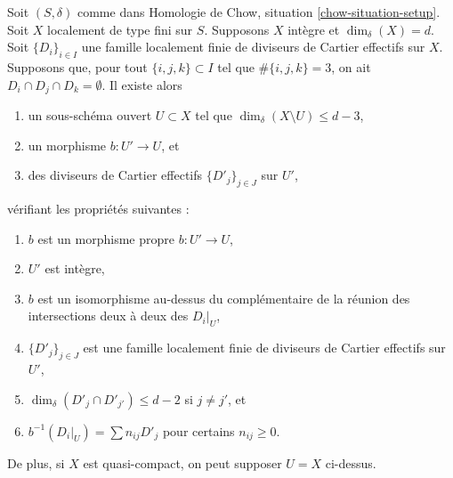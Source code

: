 \begin{lemma}
\label{lemma-blowing-up-intersections}
Soit $(S, \delta)$ comme dans Homologie de Chow, situation \ref{chow-situation-setup}.
Soit $X$ localement de type fini sur $S$.
Supposons $X$ intègre et $\dim_\delta(X) = d$.
Soit $\{D_i\}_{i \in I}$ une famille localement finie de
diviseurs de Cartier effectifs sur $X$.
Supposons que, pour tout $\{i, j, k\} \subset I$ tel que $\#\{i, j, k\} = 3$,
on ait $D_i \cap D_j \cap D_k = \emptyset$.
Il existe alors
\begin{enumerate}
\item un sous-schéma ouvert $U \subset X$ tel que
$\dim_\delta(X \setminus U) \leq d - 3$,
\item un morphisme $b : U' \to U$, et
\item des diviseurs de Cartier effectifs $\{D'_j\}_{j \in J}$ sur $U'$,
\end{enumerate}
vérifiant les propriétés suivantes :
\begin{enumerate}
\item $b$ est un morphisme propre $b : U' \to U$,
\item $U'$ est intègre,
\item $b$ est un isomorphisme au-dessus du complémentaire de la réunion des
intersections deux à deux des $D_i|_U$,
\item $\{D'_j\}_{j \in J}$ est une famille localement finie de diviseurs de
Cartier effectifs sur $U'$,
\item $\dim_\delta(D'_j \cap D'_{j'}) \leq d - 2$ si $j \not = j'$, et
\item $b^{-1}(D_i|_U) = \sum n_{ij} D'_j$ pour certains $n_{ij} \geq 0$.
\end{enumerate}
De plus, si $X$ est quasi-compact, on peut supposer $U = X$ ci-dessus.
\end{lemma}

